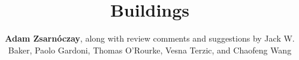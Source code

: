 %
%
%


%
%
%
%
%
%
%
%

\title{Buildings}
\author{
    \textbf{Adam Zsarnóczay},
    \newline
    along with review comments and suggestions by Jack W. Baker, Paolo Gardoni, Thomas O'Rourke, Vesna Terzic, and Chaofeng Wang
}
\tocauthor{}
%
%
\maketitle
\label{chapter:perf_bldg}

